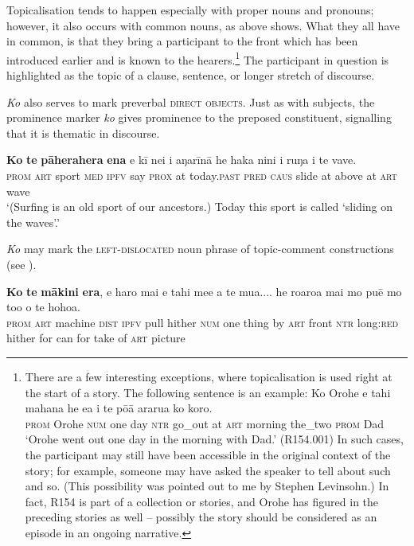 Topicalisation tends to happen especially with proper nouns and pronouns; however, it also occurs with common nouns, as  above shows. What they all have in common, is that they bring a participant to the front which has been introduced earlier and is known to the hearers.\footnote{\label{fn:424}There are a few interesting exceptions, where topicalisation is used right at the start of a story. The following sentence is an example:
\ea
\gll Ko {\ꞌ}Orohe e tahi mahana he e{\ꞌ}a {\ꞌ}i te pō{\ꞌ}ā ararua ko koro.\\
  \textsc{prom} Orohe \textsc{num} one day \textsc{ntr} go\_out at \textsc{art} morning the\_two \textsc{prom} Dad\\
  \glt 
  ‘Orohe went out one day in the morning with Dad.’ (R154.001)\z
In such cases, the participant may still have been accessible in the original context of the story; for example, someone may have asked the speaker to tell about such and so. (This possibility was pointed out to me by Stephen Levinsohn.) In fact, R154 is part of a collection or stories, and Orohe has figured in the preceding stories as well – possibly the story should be considered as an episode in an ongoing narrative.} The participant in question is highlighted as the topic of a clause, sentence, or longer stretch of discourse.

\textit{Ko} also serves to mark preverbal \textsc{direct objects}. Just as with subjects, the prominence marker \textit{ko} gives prominence to the preposed constituent, signalling that it is thematic in discourse.

\ea\label{ex:8.85}
\gll \textbf{Ko} \textbf{te} \textbf{pāherahera} \textbf{ena} e kī nei {\ꞌ}i {\ꞌ}aŋarīnā he haka nini  {\ꞌ}i ruŋa i te vave.\\
\textsc{prom} \textsc{art} sport \textsc{med} \textsc{ipfv} say \textsc{prox} at today.\textsc{past} \textsc{pred} \textsc{caus} slide  at above at \textsc{art} wave\\

\glt 
‘(Surfing is an old sport of our ancestors.) Today this sport is called ‘sliding on the waves’.’ \textstyleExampleref{[R645.003]} 
\z

\textit{Ko} may mark the \textsc{left-dislocated} noun phrase of topic-comment constructions (see ).


\ea\label{ex:8.86}
\gll \textbf{Ko} \textbf{te} \textbf{mākini} \textbf{era}, e haro mai e tahi me{\ꞌ}e a te mu{\ꞌ}a.... he roaroa mai mo puē mo to{\ꞌ}o o te hoho{\ꞌ}a.\\
\textsc{prom} \textsc{art} machine \textsc{dist} \textsc{ipfv} pull hither \textsc{num} one thing by \textsc{art} front \textsc{ntr} long:\textsc{red} hither for can for take of \textsc{art} picture\\


